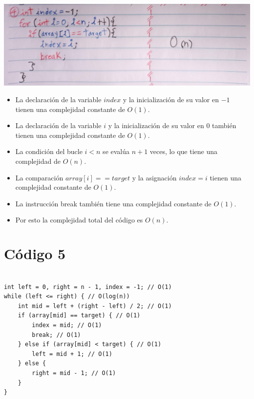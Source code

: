 \documentclass[a4paper,onecolumn,10pt]{article}
\begin{document}
\includegraphics[width=1.15\linewidth]{imagenes/punto 4.jpeg}
\\
\begin{itemize}

    \item La declaración de la variable $index$ y la inicialización de su valor en $-1$ tienen una complejidad constante de $O(1)$.
    
    \item La declaración de la variable $i$ y la inicialización de su valor en $0$ también tienen una complejidad constante de $O(1)$.
    
    \item La condición del bucle $i < n$ se evalúa $n + 1$ veces, lo que tiene una complejidad de $O(n)$.
    
    \item La comparación $array[i] == target$ y la asignación $index = i$ tienen una complejidad constante de $O(1)$.
    
    \item La instrucción break también tiene una complejidad constante de $O(1)$.
    
    \item Por esto la complejidad total del código es $O(n)$.

\end{itemize}

\section{Código 5}

\begin{verbatim}

int left = 0, right = n - 1, index = -1; // O(1)
while (left <= right) { // O(log(n))
    int mid = left + (right - left) / 2; // O(1)
    if (array[mid] == target) { // O(1)
        index = mid; // O(1)
        break; // O(1)
    } else if (array[mid] < target) { // O(1)
        left = mid + 1; // O(1)
    } else {
        right = mid - 1; // O(1)
    }
}

\end{verbatim}
\end{document}
